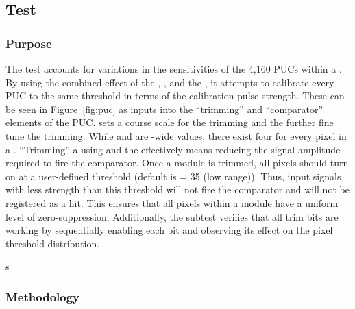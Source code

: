 
\newpage

\subsection{\trimming Test}
\label{ss:trimming}

\subsubsection{Purpose}

The \trimming test accounts for variations in the sensitivities of the 4,160 PUCs within a \roc.
By using the combined effect of the \vthrcomp, \vtrim, and the \trimbits,
it attempts to calibrate every PUC to the same threshold in terms of the calibration pulse strength.
These \dacs can be seen in Figure~\ref{fig:puc} as inputs into the ``trimming'' and ``comparator'' elements of the PUC.
\vtrim sets a course scale for the trimming and the \trimbits further fine tune the trimming.
While \vthrcomp and \vtrim are \roc-wide values, there exist four \trimbits for every pixel in a \roc.
``Trimming'' a \roc using \vtrim and the \trimbits effectively means reducing the signal amplitude required to fire the comparator.
Once a module is trimmed, all pixels should turn on at a user-defined threshold (default is \vcal = 35 (low range)).
Thus, input signals with less strength than this threshold will not fire the comparator and will not be registered as a hit.
This ensures that all pixels within a module have a uniform level of zero-suppression.
Additionally, the \trimbit subtest verifies that all trim bits are working
by sequentially enabling each bit and observing its effect on the pixel threshold distribution.

s\subsubsection{Methodology}

